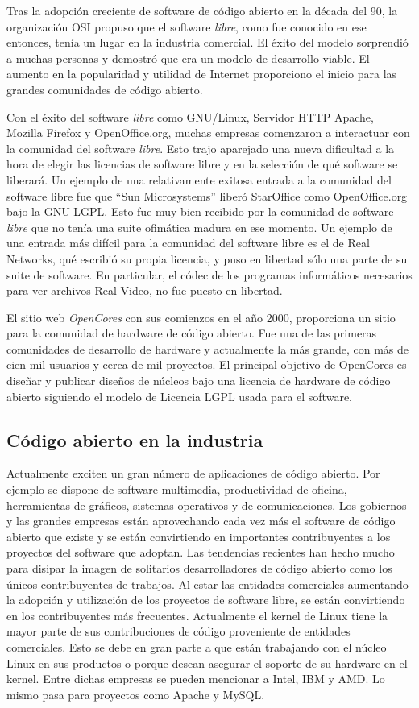 Tras la adopción creciente de software de código abierto en la década
del 90, la organización OSI propuso que el software \textit{libre},
como fue conocido en ese entonces, tenía un lugar en la industria
comercial. El éxito del modelo sorprendió a muchas personas y demostró
que era un modelo de desarrollo viable. El aumento en la popularidad y
utilidad de Internet proporciono el inicio para las grandes
comunidades de código abierto.

Con el éxito del software \textit{libre} como GNU/Linux, Servidor HTTP
Apache, Mozilla Firefox y OpenOffice.org, muchas empresas
comenzaron a interactuar con la comunidad del software
\textit{libre}. Esto trajo aparejado una nueva dificultad a la hora de
elegir las licencias de software libre y en la selección de qué
software se liberará. Un ejemplo de una relativamente exitosa entrada
a la comunidad del software libre fue que ``Sun Microsystems'' liberó
StarOffice como OpenOffice.org bajo la GNU LGPL. Esto fue muy bien
recibido por la comunidad de software \textit{libre} que no tenía una
suite ofimática madura en ese momento. Un ejemplo de una entrada más
difícil para la comunidad del software libre es el de Real Networks,
qué escribió su propia licencia, y puso en libertad sólo una parte de
su suite de software. En particular, el códec de los programas
informáticos necesarios para ver archivos Real Video, no fue puesto en
libertad.

El sitio web \textit{OpenCores} con sus comienzos en el año 2000,
proporciona un sitio para la comunidad de hardware de código abierto.
Fue una de las primeras comunidades de desarrollo de hardware y
actualmente la más grande, con más de cien mil usuarios y cerca de mil
proyectos. El principal objetivo de OpenCores es diseñar y publicar
diseños de núcleos bajo una licencia de hardware de código abierto
siguiendo el modelo de Licencia LGPL usada para el software.

\subsection{Código abierto en la industria}

Actualmente exciten un gran número de aplicaciones de código
abierto. Por ejemplo se dispone de software multimedia, productividad
de oficina, herramientas de gráficos, sistemas operativos y de
comunicaciones. Los gobiernos y las grandes empresas están
aprovechando cada vez más el software de código abierto que existe y
se están convirtiendo en importantes contribuyentes a los proyectos
del software que adoptan. Las tendencias recientes han hecho mucho
para disipar la imagen de solitarios desarrolladores de código abierto
como los únicos contribuyentes de trabajos. Al estar las entidades
comerciales aumentando la adopción y utilización de los proyectos de
software libre, se están convirtiendo en los contribuyentes más
frecuentes. Actualmente el kernel de Linux tiene la mayor parte de sus
contribuciones de código proveniente de entidades comerciales. Esto se
debe en gran parte a que están trabajando con el núcleo Linux en sus
productos o porque desean asegurar el soporte de su hardware en el
kernel. Entre dichas empresas se pueden mencionar a Intel, IBM y
AMD. Lo mismo pasa para proyectos como Apache y MySQL.

